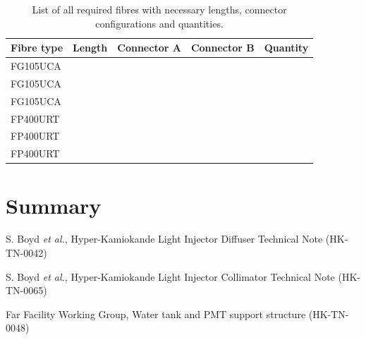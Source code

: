 \documentclass[a4paper,11pt]{article}
\begin{document}
\begin{table}[h]
\centering
\begin{tabular}{lllll}
\hline
Fibre type & Length & Connector A & Connector B & Quantity \\ \hline
FG105UCA   &        &             &             &          \\
FG105UCA   &        &             &             &          \\
FG105UCA   &        &             &             &          \\
FP400URT   &        &             &             &          \\
FP400URT   &        &             &             &          \\
FP400URT   &        &             &             &         \\ \hline
\end{tabular}
\caption{List of all required fibres with necessary lengths, connector configurations and quantities.}\label{tab:fibrelengths}
\end{table}

\section{Summary}

\newpage
\begin{thebibliography}{99}

S. Boyd {\it et al.}, Hyper-Kamiokande Light Injector Diffuser Technical Note (HK-TN-0042)

S. Boyd {\it et al.}, Hyper-Kamiokande Light Injector Collimator Technical Note (HK-TN-0065)

Far Facility Working Group, Water tank and PMT support structure (HK-TN-0048)

\end{thebibliography}
\end{document}

